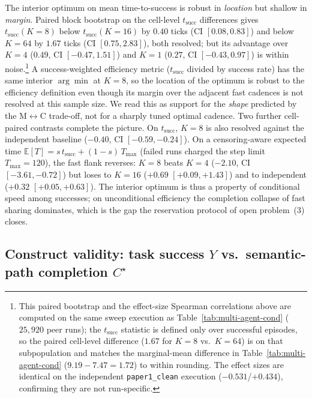 \documentclass{article}
\begin{document}
The interior optimum on mean time-to-success is robust in \emph{location} but shallow in \emph{margin}. Paired block bootstrap on the cell-level $t_{\mathrm{succ}}$ differences gives $t_{\mathrm{succ}}(K{=}8)$ below $t_{\mathrm{succ}}(K{=}16)$ by $0.40$ ticks (CI $[0.08,0.83]$) and below $K{=}64$ by $1.67$ ticks (CI $[0.75,2.83]$), both resolved; but its advantage over $K{=}4$ ($0.49$, CI $[-0.47,1.51]$) and $K{=}1$ ($0.27$, CI $[-0.43,0.97]$) is within noise.\footnote{This paired bootstrap and the effect-size Spearman correlations above are computed on the same sweep execution as Table~\ref{tab:multi-agent-cond} ($25{,}920$ peer runs); the $t_{\mathrm{succ}}$ statistic is defined only over successful episodes, so the paired cell-level difference ($1.67$ for $K{=}8$ vs.\ $K{=}64$) is on that subpopulation and matches the marginal-mean difference in Table~\ref{tab:multi-agent-cond} ($9.19{-}7.47{=}1.72$) to within rounding. The effect sizes are identical on the independent \texttt{paper1\_clean} execution ($-0.531$/$+0.434$), confirming they are not run-specific.} A success-weighted efficiency metric ($t_{\mathrm{succ}}$ divided by success rate) has the same interior $\arg\min$ at $K{=}8$, so the location of the optimum is robust to the efficiency definition even though its margin over the adjacent fast cadences is not resolved at this sample size. We read this as support for the \emph{shape} predicted by the M$\leftrightarrow$C trade-off, not for a sharply tuned optimal cadence. Two further cell-paired contrasts complete the picture. On $t_{\mathrm{succ}}$, $K{=}8$ is also resolved against the independent baseline ($-0.40$, CI $[-0.59,-0.24]$). On a censoring-aware expected time $\mathbb{E}[T] = s\,t_{\mathrm{succ}} + (1-s)\,T_{\max}$ (failed runs charged the step limit $T_{\max}{=}120$), the fast flank reverses: $K{=}8$ beats $K{=}4$ ($-2.10$, CI $[-3.61,-0.72]$) but loses to $K{=}16$ ($+0.69$ $[+0.09,+1.43]$) and to independent ($+0.32$ $[+0.05,+0.63]$). The interior optimum is thus a property of conditional speed among successes; on unconditional efficiency the completion collapse of fast sharing dominates, which is the gap the reservation protocol of open problem~(3) closes.

\subsection{Construct validity: task success $Y$ vs.\ semantic-path completion $C^\star$}
\label{app:y-vs-c}
\end{document}

